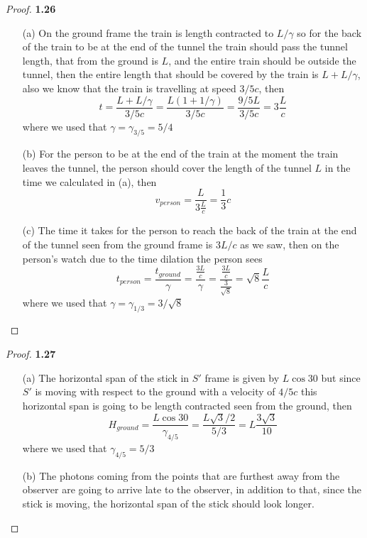 \documentclass[11pt]{article}
\theoremstyle{definition}
\begin{document}
	\begin{proof}{\textbf{1.26}}
        \begin{itemize}
            \item [(a)] On the ground frame the train is length contracted to
            $L/\gamma$ so for the back of the train to be at the end of the
            tunnel the train should pass the tunnel length, that from the
            ground is $L$, and the entire train should be outside the tunnel,
            then the entire length that should be covered by the train is
            $L + L/\gamma$, also we know that the train is travelling at speed
            $3/5c$, then
            $$t = \frac{L + L/\gamma}{3/5c}
                = \frac{L(1 + 1/\gamma)}{3/5c}
                = \frac{9/5L}{3/5c}
                = 3\frac{L}{c}$$
            where we used that $\gamma = \gamma_{3/5} = 5/4$
            \item [(b)] For the person to be at the end of the train at the
            moment the train leaves the tunnel, the person should cover the
            length of the tunnel $L$ in the time we calculated in (a), then
            $$v_{person} = \frac{L}{3\frac{L}{c}} = \frac{1}{3}c$$
            \item [(c)] The time it takes for the person to reach the back of
            the train at the end of the tunnel seen from the ground frame is
            $3L/c$ as we saw, then on the person's watch due to
            the time dilation the person sees
            $$t_{person} = \frac{t_{ground}}{\gamma}
                = \frac{\frac{3L}{c}}{\gamma}
                = \frac{\frac{3L}{c}}{\frac{3}{\sqrt{8}}}
                = \sqrt{8}\frac{L}{c}$$   
            where we used that $\gamma = \gamma_{1/3} = 3/\sqrt{8}$
            \end{itemize}
    \end{proof}
	\begin{proof}{\textbf{1.27}}
        \begin{itemize}
            \item [(a)] The horizontal span of the stick in $S'$ frame is given
            by $L\cos{30}$ but since $S'$ is moving with respect to the ground
            with a velocity of $4/5c$ this horizontal span is going to be length contracted seen from the
            ground, then
            $$H_{ground} = \frac{L \cos{30}}{\gamma_{4/5}}
                = \frac{L\sqrt{3}/2}{5/3}
                = L\frac{3\sqrt{3}}{10}$$
            where we used that $\gamma_{4/5} = 5/3$
            \item [(b)] The photons coming from the points that are furthest
            away from the observer are going to arrive late to the observer,
            in addition to that, since the stick is moving, the horizontal span
            of the stick should look longer. 
        \end{itemize}
    \end{proof}
\end{document}
